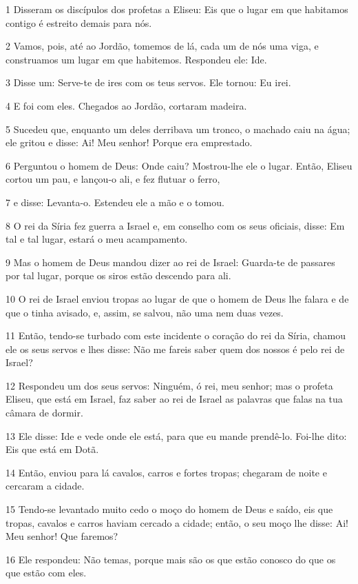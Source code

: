 \par 1 Disseram os discípulos dos profetas a Eliseu: Eis que o lugar em que habitamos contigo é estreito demais para nós.
\par 2 Vamos, pois, até ao Jordão, tomemos de lá, cada um de nós uma viga, e construamos um lugar em que habitemos. Respondeu ele: Ide.
\par 3 Disse um: Serve-te de ires com os teus servos. Ele tornou: Eu irei.
\par 4 E foi com eles. Chegados ao Jordão, cortaram madeira.
\par 5 Sucedeu que, enquanto um deles derribava um tronco, o machado caiu na água; ele gritou e disse: Ai! Meu senhor! Porque era emprestado.
\par 6 Perguntou o homem de Deus: Onde caiu? Mostrou-lhe ele o lugar. Então, Eliseu cortou um pau, e lançou-o ali, e fez flutuar o ferro,
\par 7 e disse: Levanta-o. Estendeu ele a mão e o tomou.
\par 8 O rei da Síria fez guerra a Israel e, em conselho com os seus oficiais, disse: Em tal e tal lugar, estará o meu acampamento.
\par 9 Mas o homem de Deus mandou dizer ao rei de Israel: Guarda-te de passares por tal lugar, porque os siros estão descendo para ali.
\par 10 O rei de Israel enviou tropas ao lugar de que o homem de Deus lhe falara e de que o tinha avisado, e, assim, se salvou, não uma nem duas vezes.
\par 11 Então, tendo-se turbado com este incidente o coração do rei da Síria, chamou ele os seus servos e lhes disse: Não me fareis saber quem dos nossos é pelo rei de Israel?
\par 12 Respondeu um dos seus servos: Ninguém, ó rei, meu senhor; mas o profeta Eliseu, que está em Israel, faz saber ao rei de Israel as palavras que falas na tua câmara de dormir.
\par 13 Ele disse: Ide e vede onde ele está, para que eu mande prendê-lo. Foi-lhe dito: Eis que está em Dotã.
\par 14 Então, enviou para lá cavalos, carros e fortes tropas; chegaram de noite e cercaram a cidade.
\par 15 Tendo-se levantado muito cedo o moço do homem de Deus e saído, eis que tropas, cavalos e carros haviam cercado a cidade; então, o seu moço lhe disse: Ai! Meu senhor! Que faremos?
\par 16 Ele respondeu: Não temas, porque mais são os que estão conosco do que os que estão com eles.
